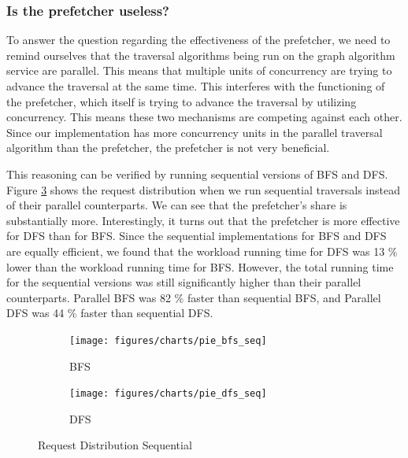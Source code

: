 \subsubsection{Is the prefetcher useless?}\label{sec:prefetcherUseless}
To answer the question regarding the effectiveness of the prefetcher,
we need to remind ourselves that the traversal algorithms being run on the graph
algorithm service are parallel. This means that multiple units of concurrency
are trying to advance the traversal at the same time. This interferes with the
functioning of the prefetcher, which itself is trying to advance the traversal by
utilizing concurrency. This means these two mechanisms are competing against
each other. Since our implementation has more concurrency units in the 
parallel traversal algorithm than the prefetcher, the prefetcher is not very
beneficial.

\medskip
This reasoning can be verified by running sequential versions of
BFS and DFS. Figure \ref{fig:reqDistSeq} shows the request distribution when we
run sequential traversals instead of their parallel counterparts. We can see
that the prefetcher's share is substantially more. Interestingly, it turns out
that the prefetcher is more effective for DFS than for BFS. Since the sequential
implementations for BFS and DFS are equally efficient, we found that the
workload running time for DFS was 13 \% lower than the workload running time 
for BFS. However, the total running time for the sequential versions was still
significantly higher than their parallel counterparts. Parallel BFS was 82 \%
faster than sequential BFS, and Parallel DFS was 44 \% faster than sequential
DFS.
\begin{figure}[ht]
    \centering
    \begin{subfigure}[b]{0.48\textwidth}
        \centering
        \texttt{[image: figures/charts/pie\_bfs\_seq]}
        \caption{BFS}
        \label{fig:bfsPieSeq}
    \end{subfigure}
    \hfill
    \begin{subfigure}[b]{0.48\textwidth}
        \texttt{[image: figures/charts/pie\_dfs\_seq]}
        \caption{DFS}
        \label{fig:dfsPieSeq}
    \end{subfigure}
    \caption{Request Distribution Sequential}
    \label{fig:reqDistSeq}
\end{figure}

